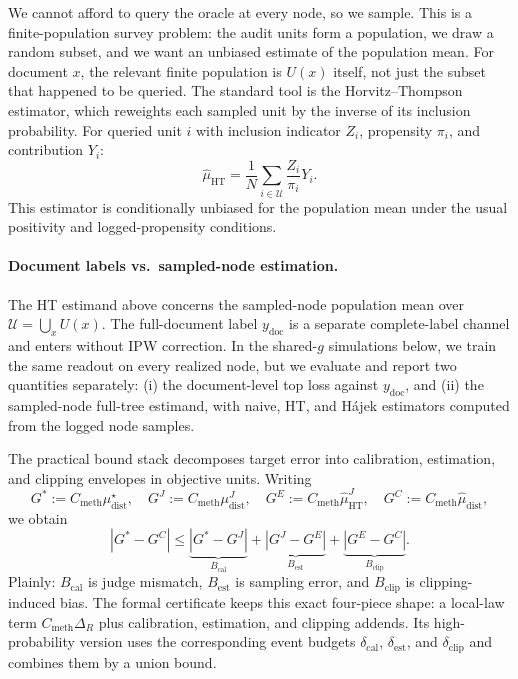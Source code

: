 We cannot afford to query the oracle at every node, so we sample. This is a finite-population survey problem: the audit units form a population, we draw a random subset, and we want an unbiased estimate of the population mean. For document $x$, the relevant finite population is $U(x)$ itself, not just the subset that happened to be queried. The standard tool is the Horvitz--Thompson estimator, which reweights each sampled unit by the inverse of its inclusion probability. For queried unit $i$ with inclusion indicator $Z_i$, propensity $\pi_i$, and contribution $Y_i$:
\[
\hat{\mu}_{\mathrm{HT}} = \frac{1}{N}\sum_{i \in \mathcal{U}} \frac{Z_i}{\pi_i}Y_i.
\]
This estimator is conditionally unbiased for the population mean under the usual positivity and logged-propensity conditions.

\paragraph{Document labels vs.\ sampled-node estimation.}
The HT estimand above concerns the sampled-node population mean over $\mathcal{U}=\bigcup_x U(x)$. The full-document label $y_{\mathrm{doc}}$ is a separate complete-label channel and enters without IPW correction. In the shared-$g$ simulations below, we train the same readout on every realized node, but we evaluate and report two quantities separately: (i) the document-level top loss against $y_{\mathrm{doc}}$, and (ii) the sampled-node full-tree estimand, with naive, HT, and H\'ajek estimators computed from the logged node samples.

The practical bound stack decomposes target error into calibration, estimation, and clipping envelopes in objective units. Writing
\[
G^\ast := C_{\mathrm{meth}}\mu_{\mathrm{dist}}^{\star},\quad
G^J := C_{\mathrm{meth}}\mu_{\mathrm{dist}}^{J},\quad
G^E := C_{\mathrm{meth}}\hat{\mu}_{\mathrm{HT}}^{J},\quad
G^C := C_{\mathrm{meth}}\hat{\mu}_{\mathrm{dist}},
\]
we obtain
\[
|G^\ast-G^C| \le \underbrace{|G^\ast-G^J|}_{B_{\mathrm{cal}}} + \underbrace{|G^J-G^E|}_{B_{\mathrm{est}}} + \underbrace{|G^E-G^C|}_{B_{\mathrm{clip}}}.
\]
Plainly: $B_{\mathrm{cal}}$ is judge mismatch, $B_{\mathrm{est}}$ is sampling error, and $B_{\mathrm{clip}}$ is clipping-induced bias. The formal certificate keeps this exact four-piece shape: a local-law term $C_{\mathrm{meth}}\Delta_R$ plus calibration, estimation, and clipping addends. Its high-probability version uses the corresponding event budgets $\delta_{\mathrm{cal}}$, $\delta_{\mathrm{est}}$, and $\delta_{\mathrm{clip}}$ and combines them by a union bound.

